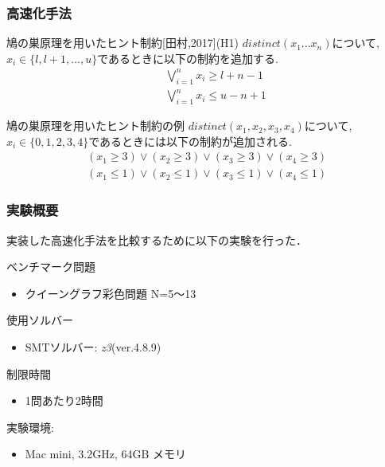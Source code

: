 \documentclass [dvipdfmx,11pt]{beamer}
\begin{document}
\begin{frame}
    \frametitle{高速化手法}
    \vspace{-3mm}
    \begin{block}{鳩の巣原理を用いたヒント制約[田村,2017](H1)}
        $distinct(x_1 ... x_n)$について, $x_i \in \{l, l+1, ..., u\}$であるときに以下の制約を追加する.
        \vspace{-3mm}
        \begin{eqnarray*}
            && \bigvee_{i=1}^n   x_i \geq l+n-1\\
            && \bigvee_{i=1}^n   x_i \leq u-n+1
        \end{eqnarray*}
    \end{block}
    \begin{exampleblock}{鳩の巣原理を用いたヒント制約の例}
        $distinct(x_1, x_2, x_3, x_4)$について, $x_i \in \{0,1,2,3,4\}$であるときには以下の制約が追加される.\\
        \vspace{-3mm}
        \begin{eqnarray*}
            (x_1 \geq 3) \lor (x_2 \geq 3) \lor (x_3 \geq 3) \lor (x_4 \geq 3)\\
            (x_1 \leq 1) \lor (x_2 \leq 1) \lor (x_3 \leq 1) \lor (x_4 \leq 1)
        \end{eqnarray*}
    \end{exampleblock}
\end{frame}





\begin{frame}
    \frametitle{実験概要}
    実装した高速化手法を比較するために以下の実験を行った．
    \begin{block}{}
    ベンチマーク問題
    \begin{itemize}
        \item クイーングラフ彩色問題 N=5〜13
    \end{itemize}
    使用ソルバー
    \begin{itemize}
        \item SMTソルバー: \textit{z3}(ver.4.8.9)
    \end{itemize}
    制限時間
    \begin{itemize}
        \item 1問あたり2時間
    \end{itemize}
    実験環境:
    \begin{itemize}
        \item Mac mini,  3.2GHz,  64GB メモリ
    \end{itemize}
    \end{block}
\end{frame}
\end{document}
